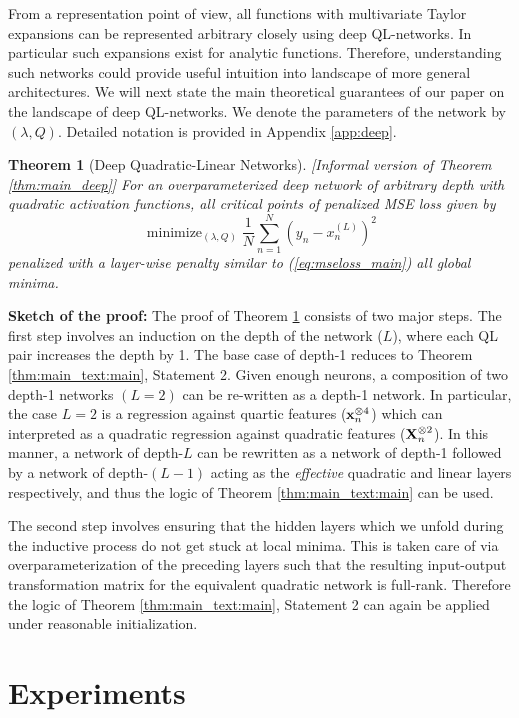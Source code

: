 \documentclass[11pt]{article}
\theoremstyle{plain}
\newtheorem{theorem}{Theorem}
\DeclareMathOperator*{\minimize}{minimize}
\theoremstyle{plain}
\numberwithin{equation}{section}
\numberwithin{lemma}{section}
\numberwithin{theorem}{section}
\numberwithin{corollary}{section}
\numberwithin{observation}{section}
\numberwithin{definition}{section}
\numberwithin{example}{section}
\begin{document}
From a representation point of view, all functions with multivariate Taylor expansions can be represented arbitrary closely using deep QL-networks. In particular such expansions exist for analytic functions. Therefore, understanding such networks could provide useful intuition into landscape of more general architectures. We will next state the main theoretical guarantees of our paper on the landscape of deep QL-networks. We denote the parameters of the network by $(\lambda,Q)$. Detailed notation is provided in Appendix \ref{app:deep}.

\begin{theorem}[Deep Quadratic-Linear Networks] \label{thm:main_text:main_deep} [Informal version of Theorem \ref{thm:main_deep}] For an overparameterized deep network of arbitrary depth with quadratic activation functions, all critical points of penalized MSE loss given by
\[
\minimize_{(\lambda,Q)} \frac{1}{N}\sum_{n=1}^N \left( y_n - x_n^{(L)}\right)^2
\]
penalized with a layer-wise penalty similar to (\ref{eq:mseloss_main}) all global minima.
\end{theorem}
\noindent \textbf{Sketch of the proof:} The proof of Theorem \ref{thm:main_text:main_deep} consists of two major steps. The first step involves an induction on the depth of the network ($L$), where each QL pair increases the depth by 1. The base case of depth-1 reduces to Theorem \ref{thm:main_text:main}, Statement 2. Given enough neurons, a composition of two depth-1 networks $(L=2)$ can be re-written as a depth-1 network. In particular, the case $L=2$ is a regression against quartic features ($\V{x}_n^{\otimes 4}$) which can  interpreted as a quadratic regression against quadratic features ($\Mx{X}_n^{\otimes 2}$).  In this manner, a network of depth-$L$ can be rewritten as a network of depth-1 followed by a network of depth-$(L-1)$ acting as the \textit{effective} quadratic and linear layers respectively, and thus the logic of Theorem \ref{thm:main_text:main} can be used.

The second step involves ensuring that the hidden layers which we unfold during the inductive process do not get stuck at local minima. This is taken care of via overparameterization of the preceding layers such that the resulting input-output transformation matrix for the equivalent quadratic network is full-rank. Therefore the logic of Theorem \ref{thm:main_text:main}, Statement 2 can again be applied under reasonable initialization. \section{Experiments} \label{sec:experiments}
\end{document}
